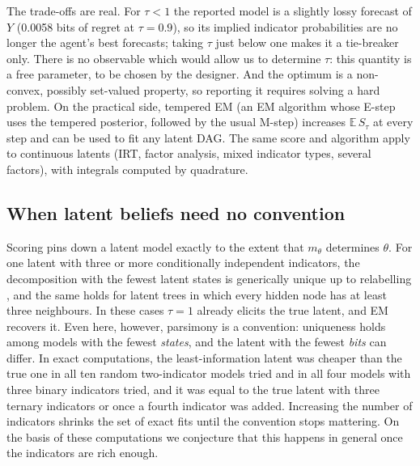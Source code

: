\begin{draftblock}
The trade-offs are real. For $\tau<1$ the reported model is a slightly lossy forecast of $Y$ (0.0058 bits of regret at $\tau=0.9$), so its implied indicator probabilities are no longer the agent's best forecasts; taking $\tau$ just below one makes it a tie-breaker only. There is no observable which would allow us to determine $\tau$: this quantity is a free parameter, to be chosen by the designer. And the optimum is a non-convex, possibly set-valued property, so reporting it requires solving a hard problem. On the practical side, tempered EM (an EM algorithm whose E-step uses the tempered posterior, followed by the usual M-step) increases $\mathbb E\,S_\tau$ at every step and can be used to fit any latent DAG. The same score and algorithm apply to continuous latents (IRT, factor analysis, mixed indicator types, several factors), with integrals computed by quadrature.

\subsection{When latent beliefs need no convention}

Scoring pins down a latent model exactly to the extent that $m_\theta$ determines $\theta$. For one latent with three or more conditionally independent indicators, the decomposition with the fewest latent states is generically unique up to relabelling \citep{kruskalThreewayArraysRank1977,allmanIdentifiabilityParametersLatent2009}, and the same holds for latent trees in which every hidden node has at least three neighbours. In these cases $\tau=1$ already elicits the true latent, and EM recovers it. Even here, however, parsimony is a convention: uniqueness holds among models with the fewest \emph{states}, and the latent with the fewest \emph{bits} can differ. In exact computations, the least-information latent was cheaper than the true one in all ten random two-indicator models tried and in all four models with three binary indicators tried, and it was equal to the true latent with three ternary indicators or once a fourth indicator was added. Increasing the number of indicators shrinks the set of exact fits until the convention stops mattering. On the basis of these computations we conjecture that this happens in general once the indicators are rich enough.


\end{draftblock}
